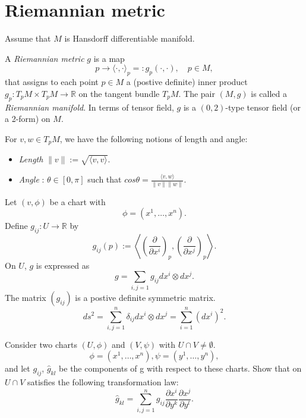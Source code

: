 \section{Riemannian metric}

Assume that $M$ is Hansdorff differentiable manifold.
\begin{definition}
    A \emph{Riemannian metric} $g$ is a map
    \[
        p \to \langle \cdot, \cdot \rangle_p =: g_p ( \cdot, \cdot ), \quad p \in M,
    \]
    that assigns to each point $p \in M$ a (postive definite) inner product $g_p: T_pM\times T_pM \to \mathbb{R}$ on the tangent bundle $T_pM$.
    The pair $\left(M, g\right)$ is called a \emph{Riemannian manifold}.
    In terms of tensor field, $g$ is a $(0,2)$-type tensor field (or a 2-form) on $M$.
\end{definition}

\begin{definition}
For $v,w \in T_p M$, we have the following notions of length and angle:
\begin{itemize}
    \item \emph{Length} $\|v\| := \sqrt{\langle v, v \rangle}$.
    \item \emph{Angle} : $\theta \in [0,\pi]$ such that $cos \theta = \frac{\langle v, w \rangle}{\|v\| \|w\|}$.
\end{itemize}
\end{definition}

\begin{example}
Let $(v, \phi)$ be a chart with
\[
\phi = (x^1, \dots, x^n).
\]
Define $g_{ij} : U \to \mathbb{R}$ by
\[
g_{ij}(p) :=  \left\langle \left(\frac{\partial}{\partial x^i}\right)_p, \left(\frac{\partial}{\partial x^j}\right)_p \right\rangle.
\]
On $U$, $g$ is expressed as 
\[
g = \sum_{i,j=1} g_{ij} dx^i \otimes dx^j.
\]
The matrix $(g_{ij})$ is a postive definite symmetric matrix.
\[
ds^2 = \sum_{i,j =1}^n \delta_{ij} dx^i \otimes dx^j = \sum_{i=1}^n (dx^i)^2.
\]
\end{example}

\begin{problem}
Consider two charts $(U, \phi)$ and $(V, \psi)$ with $U \cap V \neq \emptyset$. 
\[
\phi = (x^1, \dots, x^n), \psi = (y^1, \dots, y^n),
\]
and let $g_{ij}$, $\hat{g}_{kl}$ be the components of g with respect to these charts.
Show that on $U \cap V$ satisfies the following transformation law:
\[
\hat{g}_{kl} = \sum_{i,j=1}^n g_{ij} \frac{\partial x^i}{\partial y^k} \frac{\partial x^j}{\partial y^l}.
\]
\end{problem}

